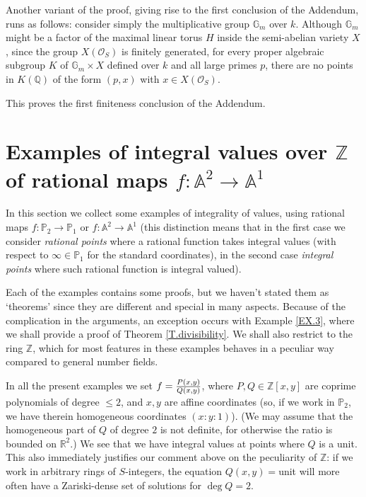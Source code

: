 \documentclass[leqno,12pt]{article} %
\def\A{{{\mathbb A}}}
\def\Z{{{\mathbb Z}}}
\def\Q{{{\mathbb Q}}}
\def\R{{{\mathbb R}}}
\def\P{{{\mathbb P}}}
\def\G{{{\mathbb G}}}
\def\O{{{\mathcal O}}}
\theoremstyle{plain} %
\theoremstyle{definition} %
\begin{document}
\medskip

Another variant of the proof, giving rise to the first conclusion of the Addendum, runs as follows: consider simply the multiplicative group $\G_m$ over $k$. Although $\G_m$ might be a factor of the maximal linear torus $H$ inside the semi-abelian variety  $X$, since the group $X(\O_S)$ is finitely generated, for every proper algebraic subgroup $K$ of $\G_m\times X$ defined over $k$ and all large primes $p$, there are no points in $K(\Q)$ of the form $(p,x)$ with $x\in X(\O_S)$.

This proves the first finiteness conclusion of the Addendum.
 

\section{Examples of integral values  over $\Z$ of  rational maps $f:\A^2\to\A^1$} \label{S.rationalmaps} 

 In this section we collect some examples of integrality of values, using rational maps $f:\P_2\to\P_1$ or $f:\A^2\to\A^1$ (this distinction  means that in the first case we consider {\it rational points} where a rational function takes integral values (with respect to $\infty\in\P_1$ for the standard coordinates), in the second case {\it  integral points} where such rational function is integral valued).
 
 Each of the examples contains some proofs, but we haven't stated them as `theorems' since they are different and special in many aspects. Because of the complication in the arguments, an exception occurs with  Example \ref{EX.3}, where we shall provide a proof of Theorem \ref{T.divisibility}.  We shall also restrict to the ring $\Z$, which for most  features in  these examples  behaves in a peculiar way compared to general number fields.

\medskip

In all the present examples we set $f={P(x,y)\over Q(x,y)}$, where $P,Q\in\Z[x,y]$ are coprime polynomials of degree $\le 2$, and $x,y$ are affine coordinates (so, if we work in $\P_2$, we have therein homogeneous coordinates $(x:y:1)$). (We may assume that the homogeneous part of $Q$ of degree $2$ is not definite, for otherwise the ratio is bounded on $\R^2$.) We see that we have integral values at points where $Q$ is a unit. This also   immediately justifies our comment above on the peculiarity of $\Z$: if we work in arbitrary  rings of $S$-integers, the equation $Q(x,y)=$unit  will more often have a Zariski-dense set of solutions for $\deg Q=2$. 
\end{document}
